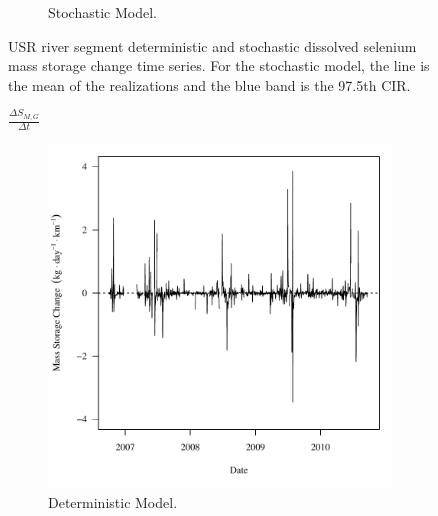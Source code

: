 \begin{linenumbers}
\begin{landscape}
\begin{figure}
\begin{subfigure}{0.7\textwidth}
			\caption{Stochastic Model.}
		\end{subfigure}
		\caption[USR river segment deterministic and stochastic dissolved selenium mass storage change time series.]{USR river segment deterministic and stochastic dissolved selenium mass storage change time series.  For the stochastic model, the line is the mean of the realizations and the blue band is the 97.5th CIR.}
		\label{fig:massSegmentStoreChange_DSR}
	\end{figure}
\end{landscape}

\subfiguremid
\begin{landscape}
	\begin{figure}
		$ \displaystyle \frac{\Delta S_{M,G}}{\Delta t} $
		\begin{subfigure}{0.7\textwidth}
			\centering
			\includegraphics[width=\tableCustomSize]{"Figures/Results_DSR/Deterministic/f Segment G"}
			\caption{Deterministic Model.}
		\end{subfigure}%
		\begin{subfigure}{0.7\textwidth}
			\centering

\end{subfigure}
\end{figure}
\end{landscape}
\end{linenumbers}
